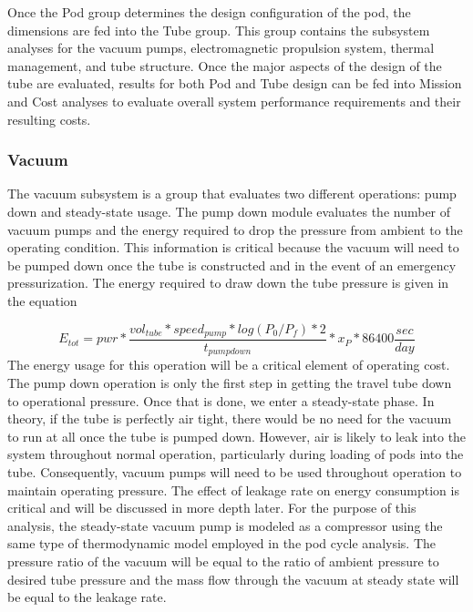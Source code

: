 	Once the Pod group determines the design configuration of the pod, the
	dimensions are fed into the Tube group. This group contains the subsystem
	analyses for the vacuum pumps, electromagnetic propulsion system, thermal
	management, and tube structure. Once the major aspects of the design of the
	tube are evaluated, results for both Pod and Tube design can be fed into
	Mission and Cost analyses to evaluate overall system performance
	requirements and their resulting costs.


\subsubsection{Vacuum}
	The vacuum subsystem is a group that evaluates two different
	operations: pump down and steady-state usage. The pump down module
	evaluates the number of vacuum pumps and the energy required to drop the pressure
	from ambient to the operating condition. This
	information is critical because the vacuum will need to be pumped down
	once the tube is constructed and in the event of an emergency pressurization.
	The energy required to draw down the tube pressure is given in the equation

	\begin{equation}
		\label{eq:vacuum}
		E_{tot} = pwr * \frac{vol_{tube}*speed_{pump}*log(P_{0}/P_{f})*2}{t_{pumpdown}}* x_{P} * 86400 \frac{sec}{day}
	\end{equation}
	The energy usage for this operation will be a critical element of
	operating cost. The pump down operation is only the first step in getting
	the travel tube down to operational pressure. Once that is done, we enter
	a steady-state phase. In theory, if the tube is perfectly air tight, there
	would be no need for the vacuum to run at all once the tube is pumped
	down. However, air is likely to leak into the system throughout normal
	operation, particularly during loading of pods into the tube.
	Consequently, vacuum pumps will need to be used throughout operation to
	maintain operating pressure. The effect of leakage rate on energy
	consumption is critical and will be discussed in more depth later. For the
	purpose of this analysis, the steady-state vacuum pump is modeled as a
	compressor using the same type of thermodynamic model employed in the pod
	cycle analysis. The pressure ratio
	of the vacuum will be equal to the ratio of ambient pressure to desired
	tube pressure and the mass flow through the vacuum at steady state will be
	equal to the leakage rate.
